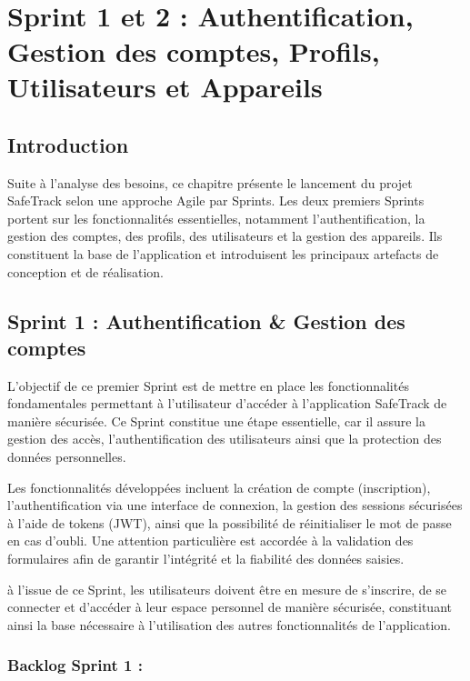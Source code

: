 ﻿﻿
\chapter{Sprint 1 et 2 : Authentification, Gestion des comptes, Profils, Utilisateurs et Appareils}
\minitoc
\newpage

\DeclareRobustCommand{\greencheck}{%
  \tikz\fill[scale=0.4, color=green]
  (0,.35) -- (.25,0) -- (1,.7) -- (.25,.15) -- cycle;%
}


\section*{Introduction}
Suite à l'analyse des besoins, ce chapitre présente le lancement du projet SafeTrack selon une approche Agile par Sprints.
Les deux premiers Sprints portent sur les fonctionnalités essentielles, notamment l'authentification, la gestion des comptes, des profils, des utilisateurs et la gestion des appareils.
Ils constituent la base de l'application et introduisent les principaux artefacts de conception et de réalisation.


\section{Sprint 1 : Authentification \& Gestion des comptes}

L'objectif de ce premier Sprint est de mettre en place les fonctionnalités fondamentales permettant à l'utilisateur d'accéder à l'application SafeTrack de manière sécurisée. Ce Sprint constitue une étape essentielle, car il assure la gestion des accès, l'authentification des utilisateurs ainsi que la protection des données personnelles.

Les fonctionnalités développées incluent la création de compte (inscription), l'authentification via une interface de connexion, la gestion des sessions sécurisées à l'aide de tokens (JWT), ainsi que la possibilité de réinitialiser le mot de passe en cas d'oubli. Une attention particulière est accordée à la validation des formulaires afin de garantir l'intégrité et la fiabilité des données saisies.

à l'issue de ce Sprint, les utilisateurs doivent être en mesure de s'inscrire, de se connecter et d'accéder à leur espace personnel de manière sécurisée, constituant ainsi la base nécessaire à l'utilisation des autres fonctionnalités de l'application.

\subsection{Backlog Sprint 1 :}

